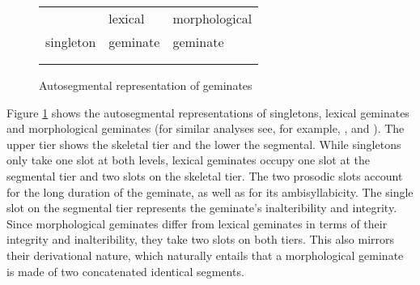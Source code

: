 \begin{figure}[h]
	\centering	
	
	\begin{tabularx}{.8\linewidth}{YYY}
		
		&		lexical			 & 		 morphological \\
		
		singleton	&			  geminate	 & 			  geminate\\		
		\\

		\begin{tikzpicture}[grow'=up]
		\Tree [.C C ] 					
		\end{tikzpicture}												&
		
		
		\begin{tikzpicture}[grow'=up]
		\Tree  [.C C C ];
		\end{tikzpicture}			
		&
		
		\begin{tikzpicture}[grow'=up]
		\Tree  [.C C ]
		\end{tikzpicture}
		\begin{tikzpicture}[grow'=up]
		\Tree  [.C C ]
		\end{tikzpicture}		
		
	\end{tabularx}
	
	\caption{Autosegmental representation of geminates}
	 \label{fig:Autosegmental representation of geminates} 

\end{figure}

Figure \ref{fig:Autosegmental representation of geminates} shows the autosegmental representations of singletons, lexical geminates and morphological geminates (for similar analyses see, for example,  \citealt[413]{Kenstowicz.1994}, \citealt[26 f.]{Gussmann.2002} and \citealt[62]{Ridouane.2010}). The upper tier shows the skeletal tier and the lower the segmental. While singletons only take one slot at both levels, lexical geminates occupy one slot at the segmental tier and two slots on the skeletal tier. The two prosodic slots account for the long duration of the geminate, as well as for its ambisyllabicity. The single slot on the segmental tier represents the geminate's inalteribility and integrity. Since morphological geminates differ from lexical geminates in terms of their integrity and inalteribility, they take two slots on both tiers. This also mirrors their derivational nature, which naturally entails that a morphological geminate is made of two concatenated identical segments.



